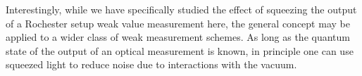 Interestingly, while we have specifically studied the effect of squeezing the output of a Rochester setup weak value measurement here, the general concept may be applied to a wider class of weak measurement schemes.  As long as the quantum state of the output of an optical measurement is known, in principle one can use squeezed light to reduce noise due to interactions with the vacuum.  

